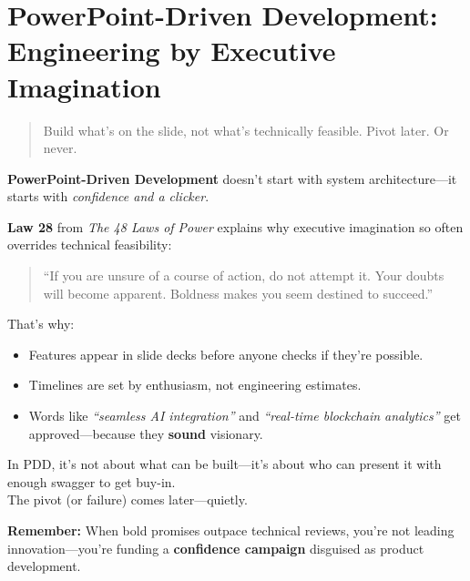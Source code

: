 \section{PowerPoint-Driven Development: Engineering by Executive Imagination}

\begin{quote}
Build what's on the slide, not what’s technically feasible. Pivot later. Or never.
\end{quote}

  \textbf{PowerPoint-Driven Development} doesn’t start with system architecture—it starts with \textit{confidence and a clicker}.
  
  \medskip
  
  \textbf{Law 28} from \textit{The 48 Laws of Power} explains why executive imagination so often overrides technical feasibility:
  \begin{quote}
  ``If you are unsure of a course of action, do not attempt it. Your doubts will become apparent. Boldness makes you seem destined to succeed.''
  \end{quote}
  
  \medskip
  
  That’s why:
  \begin{itemize}
    \item Features appear in slide decks before anyone checks if they’re possible.
    \item Timelines are set by enthusiasm, not engineering estimates.
    \item Words like \textit{``seamless AI integration''} and \textit{``real-time blockchain analytics''} get approved—because they \textbf{sound} visionary.
  \end{itemize}
  
  \medskip
  
  In PDD, it’s not about what can be built—it’s about who can present it with enough swagger to get buy-in. \\
  The pivot (or failure) comes later—quietly.
  
  \medskip
  
  \textbf{Remember:} When bold promises outpace technical reviews, you’re not leading innovation—you’re funding a \textbf{confidence campaign} disguised as product development.
  
  

